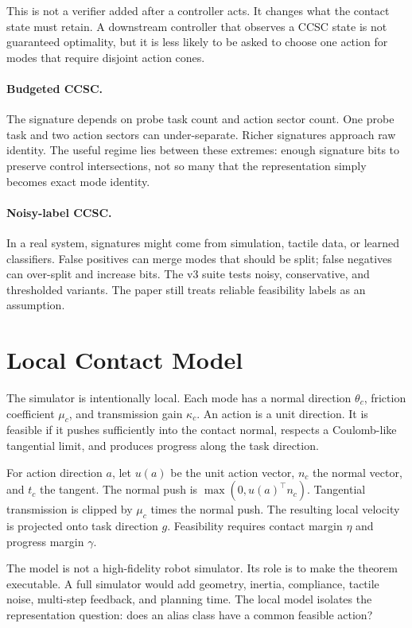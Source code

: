 \documentclass{article}
\begin{document}
This is not a verifier added after a controller acts. It changes what the contact state must retain. A downstream controller that observes a CCSC state is not guaranteed optimality, but it is less likely to be asked to choose one action for modes that require disjoint action cones.

\paragraph{Budgeted CCSC.}
The signature depends on probe task count and action sector count. One probe task and two action sectors can under-separate. Richer signatures approach raw identity. The useful regime lies between these extremes: enough signature bits to preserve control intersections, not so many that the representation simply becomes exact mode identity.

\paragraph{Noisy-label CCSC.}
In a real system, signatures might come from simulation, tactile data, or learned classifiers. False positives can merge modes that should be split; false negatives can over-split and increase bits. The v3 suite tests noisy, conservative, and thresholded variants. The paper still treats reliable feasibility labels as an assumption.

\section{Local Contact Model}
The simulator is intentionally local. Each mode has a normal direction $\theta_c$, friction coefficient $\mu_c$, and transmission gain $\kappa_c$. An action is a unit direction. It is feasible if it pushes sufficiently into the contact normal, respects a Coulomb-like tangential limit, and produces progress along the task direction.

For action direction $a$, let $u(a)$ be the unit action vector, $n_c$ the normal vector, and $t_c$ the tangent. The normal push is $\max(0,u(a)^\top n_c)$. Tangential transmission is clipped by $\mu_c$ times the normal push. The resulting local velocity is projected onto task direction $g$. Feasibility requires contact margin $\eta$ and progress margin $\gamma$.

The model is not a high-fidelity robot simulator. Its role is to make the theorem executable. A full simulator would add geometry, inertia, compliance, tactile noise, multi-step feedback, and planning time. The local model isolates the representation question: does an alias class have a common feasible action?
\end{document}
